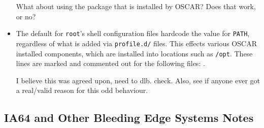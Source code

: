 \begin{itemize}
  \begin{discuss}
    What about using the  package that is
    installed by OSCAR?  Does that work, or no?
  \end{discuss}

\item The default for {\tt root}'s shell configuration files hardcode
  the value for {\tt PATH}, regardless of what is added via
  {\tt profile.d/} files.  This effects various OSCAR installed
  components, which are installed into locations such as {\tt /opt}.
  These lines are marked and commented out for the following files:
  . 

  \begin{discuss}
    I believe this was agreed upon, need to dlb. check.  Also, 
	see if anyone ever got a real/valid reason for this odd behaviour.
  \end{discuss}
\end{itemize}


\subsection{IA64 and Other Bleeding Edge Systems Notes}
\label{subsec:ia64notes}


